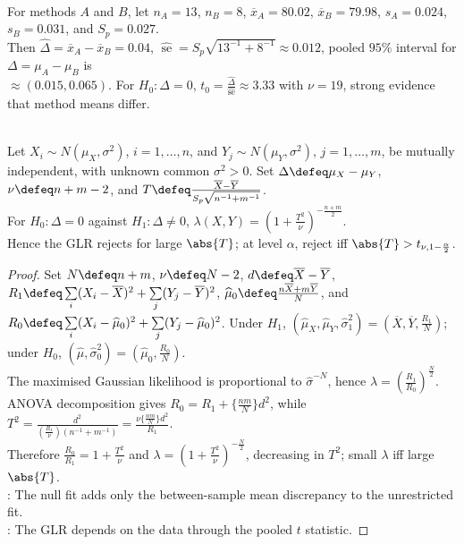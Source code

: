 \begin{example} \label{ex:latent-heat-two-methods} \\
For methods $A$ and $B$, let $n_A=13$, $n_B=8$, $\overline{x}_A=80.02$, $\overline{x}_B=79.98$, $s_A=0.024$, $s_B=0.031$, and $S_p=0.027$.\\
Then $\widehat{\Delta}=\overline{x}_A-\overline{x}_B=0.04$, $\widehat{\operatorname{se}}=S_p\sqrt{13^{-1}+8^{-1}}\approx0.012$, pooled $95\%$ interval for $\Delta=\mu_A-\mu_B$ is\\
$\approx (0.015,0.065)$. For $H_0:\Delta=0$, $t_0=\frac{\widehat{\Delta}}{\widehat{\operatorname{se}}}\approx3.33$ with $\nu=19$, strong evidence that method means differ.
\end{example}

\begin{proposition} \label{prop:two-sample-normal-glrt-equivalent-to-t} \\
Let $X_i\sim N(\mu_X,\sigma^2)$, $i=1,\ldots,n$, and $Y_j\sim N(\mu_Y,\sigma^2)$, $j=1,\ldots,m$, be mutually independent, with unknown common $\sigma^2>0$.
Set $\Delta\defeq\mu_X-\mu_Y$, $\nu\defeq n+m-2$, and $T\defeq\frac{\overline{X}-\overline{Y}}{S_p\sqrt{n^{-1}+m^{-1}}}$.\\
For $H_0:\Delta=0$ against $H_1:\Delta\neq0$, $\lambda(X,Y)=(1+\frac{T^2}{\nu})^{-\frac{n+m}{2}}$.\\
Hence the GLR rejects for large $\abs{T}$; at level $\alpha$, reject iff $\abs{T}>t_{\nu,1-\frac{\alpha}{2}}$.
\begin{proof} Set $N\defeq n+m$, $\nu\defeq N-2$, $d\defeq\overline{X}-\overline{Y}$, $R_1\defeq\sum\limits_i(X_i-\overline{X})^2+\sum\limits_j(Y_j-\overline{Y})^2$, $\widehat{\mu}_0\defeq\frac{n\overline{X}+m\overline{Y}}{N}$, and $R_0\defeq\sum\limits_i(X_i-\widehat{\mu}_0)^2+\sum\limits_j(Y_j-\widehat{\mu}_0)^2$. Under $H_1$, $(\widehat{\mu}_X,\widehat{\mu}_Y,\widehat{\sigma}_1^2)=(\overline{X},\overline{Y},\frac{R_1}{N})$; under $H_0$, $(\widehat{\mu},\widehat{\sigma}_0^2)=(\widehat{\mu}_0,\frac{R_0}{N})$.\\
The maximised Gaussian likelihood is proportional to $\widehat{\sigma}^{-N}$, hence $\lambda=(\frac{R_1}{R_0})^{\frac{N}{2}}$.\\
ANOVA decomposition gives $R_0=R_1+\{\frac{nm}{N}\}d^2$, while $T^2=\frac{d^2}{(\frac{R_1}{\nu})(n^{-1}+m^{-1})}=\frac{\nu\{\frac{nm}{N}\}d^2}{R_1}$.\\
Therefore $\frac{R_0}{R_1}=1+\frac{T^2}{\nu}$ and $\lambda=(1+\frac{T^2}{\nu})^{-\frac{N}{2}}$, decreasing in $T^2$; small $\lambda$ iff large $\abs{T}$.\\
: The null fit adds only the between-sample mean discrepancy to the unrestricted fit.\\
: The GLR depends on the data through the pooled $t$ statistic.
\end{proof}
\end{proposition}

